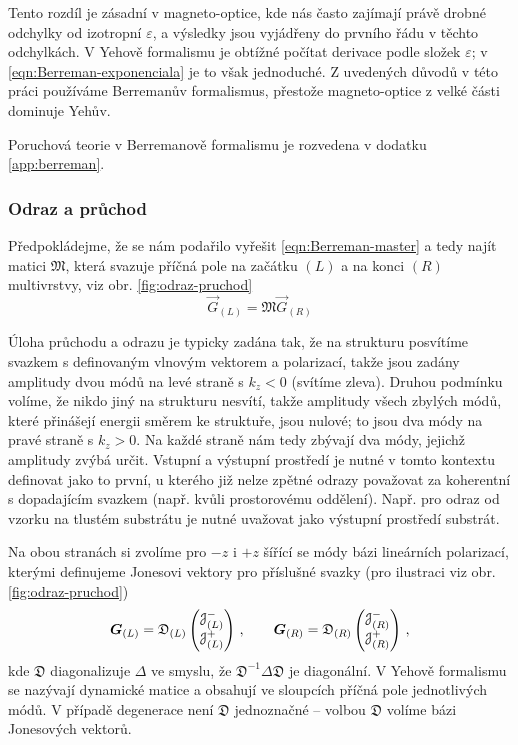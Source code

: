 Tento rozdíl je zásadní v magneto-optice, kde nás často zajímají právě drobné odchylky od izotropní $\varepsilon$, a výsledky jsou vyjádřeny do prvního řádu v těchto odchylkách.
V Yehově formalismu je obtížné počítat derivace podle složek $\varepsilon$; v \eqref{eqn:Berreman-exponenciala} je to však jednoduché\cite{bertrandGeneralAnalyticalTreatment2001}.
Z uvedených důvodů v této práci používáme Berremanův formalismus, přestože magneto-optice z velké části dominuje Yehův.

Poruchová teorie v Berremanově formalismu je rozvedena v dodatku \ref{app:berreman}.

\subsubsection*{Odraz a průchod}

Předpokládejme, že se nám podařilo vyřešit \eqref{eqn:Berreman-master} a tedy najít matici $\mathfrak{M}$, která svazuje příčná pole na začátku $(L)$ a na konci $(R)$ multivrstvy, viz obr. \ref{fig:odraz-pruchod}
\begin{equation}
    \vec{G}_{(L)}=\mathfrak{M} \vec{G}_{(R)}
\end{equation}


Úloha průchodu a odrazu je typicky zadána tak, že na strukturu posvítíme svazkem s definovaným vlnovým vektorem a polarizací, takže jsou zadány amplitudy dvou módů na levé straně s $k_z < 0$ (svítíme zleva).
Druhou podmínku volíme, že nikdo jiný na strukturu nesvítí, takže amplitudy všech zbylých módů, které přinášejí energii směrem ke struktuře, jsou nulové; to jsou dva módy na pravé straně s $k_z > 0$.
Na každé straně nám tedy zbývají dva módy, jejichž amplitudy zvýbá určit.
Vstupní a výstupní prostředí je nutné v tomto kontextu definovat jako to první, u kterého již nelze zpětné odrazy považovat za koherentní s dopadajícím svazkem (např. kvůli prostorovému oddělení).
Např. pro odraz od vzorku na tlustém substrátu je nutné uvažovat jako výstupní prostředí substrát.

Na obou stranách si zvolíme pro $-z$ i $+z$ šířící se módy bázi lineárních polarizací, kterými definujeme Jonesovi vektory pro příslušné svazky (pro ilustraci viz obr. \ref{fig:odraz-pruchod})
\begin{equation}
    \bm{G}_{(L)}=\mathfrak{D}_{(L)} \begin{pmatrix} \mathcal{J}^-_{(L)} \\ \mathcal{J}^+_{(L)} \end{pmatrix} \,, \qquad
    \bm{G}_{(R)}=\mathfrak{D}_{(R)} \begin{pmatrix} \mathcal{J}^-_{(R)} \\ \mathcal{J}^+_{(R)} \end{pmatrix} \,,
\end{equation}
kde $\mathfrak{D}$ diagonalizuje $\Delta$ ve smyslu, že $\mathfrak{D}^{-1}\Delta \mathfrak{D}$ je diagonální.
V Yehově formalismu se nazývají dynamické matice a obsahují ve sloupcích příčná pole jednotlivých módů.
V případě degenerace není $\mathfrak{D}$ jednoznačné -- volbou $\mathfrak{D}$ volíme bázi Jonesových vektorů.

